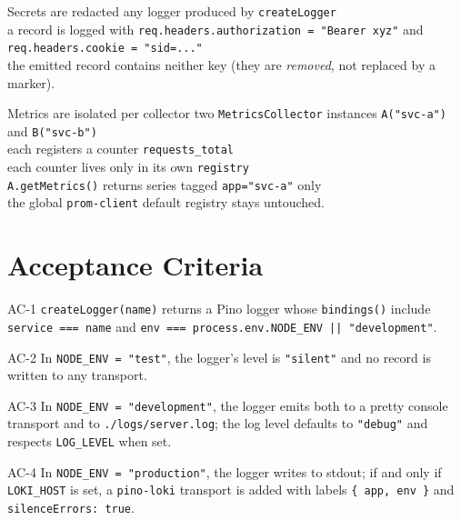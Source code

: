\begin{scenario}{Secrets are redacted}
\Given any logger produced by \texttt{createLogger} \\
\When a record is logged with \texttt{req.headers.authorization = "Bearer xyz"} and \texttt{req.headers.cookie = "sid=..."} \\
\Then the emitted record contains neither key (they are \emph{removed}, not replaced by a marker).
\end{scenario}

\begin{scenario}{Metrics are isolated per collector}
\Given two \texttt{MetricsCollector} instances \texttt{A("svc-a")} and \texttt{B("svc-b")} \\
\When each registers a counter \texttt{requests\_total} \\
\Then each counter lives only in its own \texttt{registry} \\
\And \texttt{A.getMetrics()} returns series tagged \texttt{app="svc-a"} only \\
\And the global \texttt{prom-client} default registry stays untouched.
\end{scenario}

\section{Acceptance Criteria}

\begin{ac}{AC-1}
\texttt{createLogger(name)} returns a Pino logger whose \texttt{bindings()} include \texttt{service === name} and \texttt{env === process.env.NODE\_ENV || "development"}.
\end{ac}

\begin{ac}{AC-2}
In \texttt{NODE\_ENV = "test"}, the logger's level is \texttt{"silent"} and no record is written to any transport.
\end{ac}

\begin{ac}{AC-3}
In \texttt{NODE\_ENV = "development"}, the logger emits both to a pretty console transport and to \texttt{./logs/server.log}; the log level defaults to \texttt{"debug"} and respects \texttt{LOG\_LEVEL} when set.
\end{ac}

\begin{ac}{AC-4}
In \texttt{NODE\_ENV = "production"}, the logger writes to stdout; if and only if \texttt{LOKI\_HOST} is set, a \texttt{pino-loki} transport is added with labels \texttt{\{ app, env \}} and \texttt{silenceErrors: true}.
\end{ac}

